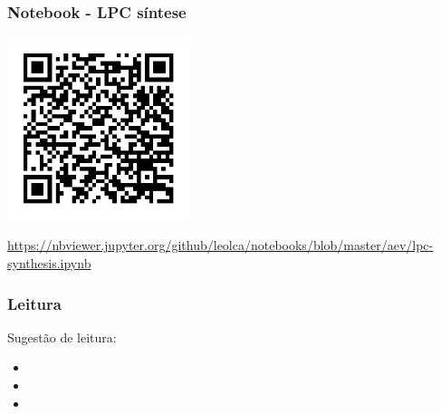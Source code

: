 \begin{frame}%
  \frametitle{Notebook - LPC síntese}
  \centering
  \includegraphics[width=0.4\textwidth]{images/qrcode-jupyter-lpc-synthesis.pdf}

  \url{https://nbviewer.jupyter.org/github/leolca/notebooks/blob/master/aev/lpc-synthesis.ipynb}
\end{frame} 


\begin{frame}
  \frametitle{Leitura}
  Sugestão de leitura:
  \begin{itemize}
  \item {}
  \item {}
  \item {} 
  \end{itemize}
\end{frame} 


